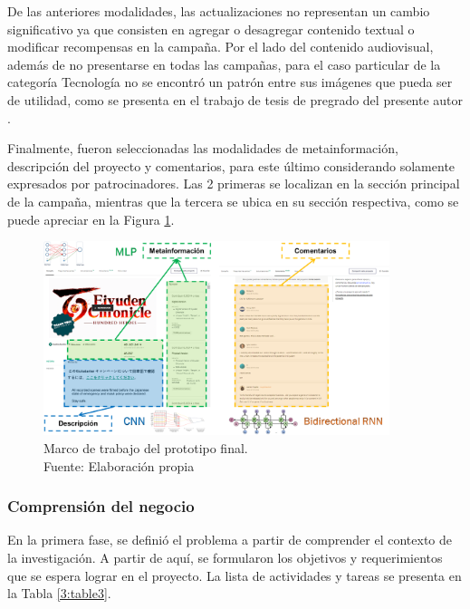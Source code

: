De las anteriores modalidades, las actualizaciones no representan un cambio significativo ya que consisten en agregar o desagregar contenido textual o modificar recompensas en la campaña. Por el lado del contenido audiovisual, además de no presentarse en todas las campañas, para el caso particular de la categoría Tecnología no se encontró un patrón entre sus imágenes que pueda ser de utilidad, como se presenta en el trabajo de tesis de pregrado del presente autor \parencite{pr_puente2019kickstarter_prediction}.

Finalmente, fueron seleccionadas las modalidades de metainformación, descripción del proyecto y comentarios, para este último considerando solamente expresados por patrocinadores. Las 2 primeras se localizan en la sección principal de la campaña, mientras que la tercera se ubica en su sección respectiva, como se puede apreciar en la Figura \ref{3:fig3}.
\begin{figure}[htbp]
	\begin{center}
		\includegraphics[width=0.90\textwidth]{3/figures/framework.png}
		\caption[Marco de trabajo del prototipo final]{Marco de trabajo del prototipo final.\\
			Fuente: Elaboración propia}
		\label{3:fig3}
	\end{center}
\end{figure}

\newpage
\subsubsection{Comprensión del negocio}
En la primera fase, se definió el problema a partir de comprender el contexto de la investigación. A partir de aquí, se formularon los objetivos y requerimientos que se espera lograr en el proyecto. La lista de actividades y tareas se presenta en la Tabla \ref{3:table3}.

